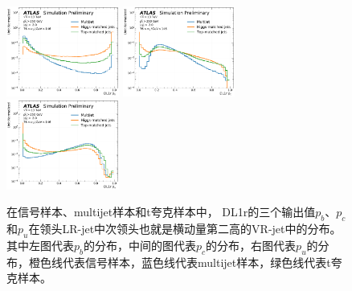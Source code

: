 \begin{figure}[h]
    \includegraphics[width=0.33\textwidth]{figuresXbb/samples/inputs_aux/dl1r_pb_2_norm.pdf}
    \includegraphics[width=0.33\textwidth]{figuresXbb/samples/inputs_aux/dl1r_pc_2_norm.pdf}
    \includegraphics[width=0.33\textwidth]{figuresXbb/samples/inputs_aux/dl1r_pu_2_norm.pdf}
  \caption{
  在信号样本、multijet样本和t夸克样本中，
DL1r的三个输出值$p_b$、$p_c$和$p_u$在领头LR-jet中次领头也就是横动量第二高的VR-jet中的分布。
其中左图代表$p_b$的分布，中间的图代表$p_c$的分布，右图代表$p_u$的分布，橙色线代表信号样本，蓝色线代表multijet样本，绿色线代表t夸克样本。
}
\label{fig:DL1RLLD}
\end{figure}

